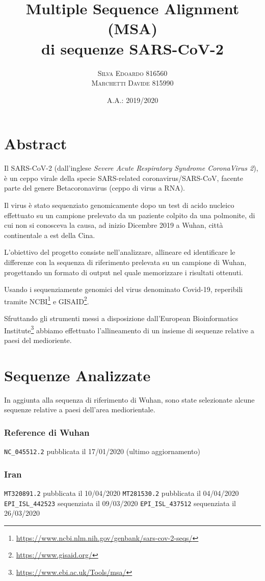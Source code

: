 \documentclass[11pt,italian]{article}
\title{Multiple Sequence Alignment (MSA) \\ di sequenze SARS-CoV-2}
\date{A.A.: 2019/2020}
\author{
    \textsc{Silva Edoardo} 816560 \\
    \textsc{Marchetti Davide} 815990
}
\makeatletter
\newcommand*{\lstitem}[1][]{%
  \setbox0\hbox\bgroup
    \patchcmd{\lst@InlineM}{\@empty}{\@empty\egroup\item[\usebox0]\leavevmode\ignorespaces}{}{}%
    \lstinline[#1]%
}
\makeatother
\begin{document}
\maketitle

\section*{Abstract}
Il SARS-CoV-2 (dall'inglese \textit{Severe Acute Respiratory Syndrome CoronaVirus 2}), è un ceppo virale della specie SARS-related coronavirus/SARS-CoV, facente parte del genere Betacoronavirus (ceppo di virus a RNA).

Il virus è stato sequenziato genomicamente dopo un test di acido nucleico effettuato su un campione prelevato da un paziente colpito da una polmonite, di cui non si conosceva la causa, ad inizio Dicembre 2019 a Wuhan, città continentale a est della Cina.

L'obiettivo del progetto consiste nell'analizzare, allineare ed identificare le differenze con la sequenza di riferimento prelevata su un campione di Wuhan, progettando un formato di output nel quale memorizzare i risultati ottenuti.

Usando i sequenziamente genomici del virus denominato Covid-19, reperibili tramite NCBI\footnote{\url{https://www.ncbi.nlm.nih.gov/genbank/sars-cov-2-seqs/}} e GISAID\footnote{\url{https://www.gisaid.org/}}.

Sfruttando gli strumenti messi a disposizione dall'European Bioinformatics Institute\footnote{\url{https://www.ebi.ac.uk/Tools/msa/}} abbiamo effettuato l'allineamento di un insieme di sequenze relative a paesi del medioriente.

\newpage
\section{Sequenze Analizzate}
In aggiunta alla sequenza di riferimento di Wuhan, sono state selezionate alcune sequenze relative a paesi dell'area mediorientale.

\subsubsection*{Reference di Wuhan}
\begin{description}
    \lstitem{NC_045512.2} pubblicata il 17/01/2020 (ultimo aggiornamento)
\end{description}

\subsubsection*{Iran}
\begin{description}
    \lstitem{MT320891.2} pubblicata il 10/04/2020
    \lstitem{MT281530.2} pubblicata il 04/04/2020
    \lstitem{EPI_ISL_442523} sequenziata il 09/03/2020
    \lstitem{EPI_ISL_437512} sequenziata il 26/03/2020
\end{description}
\end{document}
